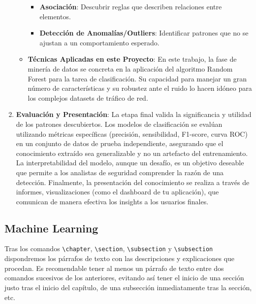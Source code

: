 \begin{enumerate}
\begin{itemize}
\begin{itemize}
            \item\textbf{Asociación}: Descubrir reglas que describen relaciones entre elementos.
            
            \item\textbf{Detección de Anomalías/Outliers}: Identificar patrones que no se ajustan a un comportamiento esperado.
              
        \end{itemize}
    \item\textbf{Técnicas Aplicadas en este Proyecto}: En este trabajo, la fase de minería de datos se concreta en la aplicación del algoritmo Random Forest para la tarea de clasificación. Su capacidad para manejar un gran número de características y su robustez ante el ruido lo hacen idóneo para los complejos datasets de tráfico de red.
    \end{itemize}
    
    \item\textbf{Evaluación y Presentación}: La etapa final valida la significancia y utilidad de los patrones descubiertos. Los modelos de clasificación se evalúan utilizando métricas específicas (precisión, sensibilidad, F1-score, curva ROC) en un conjunto de datos de prueba independiente, asegurando que el conocimiento extraído sea generalizable y no un artefacto del entrenamiento. La interpretabilidad del modelo, aunque un desafío, es un objetivo deseable que permite a los analistas de seguridad comprender la razón de una detección. Finalmente, la presentación del conocimiento se realiza a través de informes, visualizaciones (como el dashboard de tu aplicación), que comunican de manera efectiva los insights a los usuarios finales.

\end{enumerate}
\subsection{Machine Learning}

Tras los comandos \verb|\chapter|, \verb|\section|, \verb|\subsection| y \verb|\subsection| dispondremos los párrafos de texto con las descripciones y explicaciones que procedan. Es recomendable tener al menos un párrafo de texto entre dos comandos sucesivos de los anteriores, evitando así tener el inicio de una sección justo tras el inicio del capítulo, de una subsección inmediatamente tras la sección, etc.

